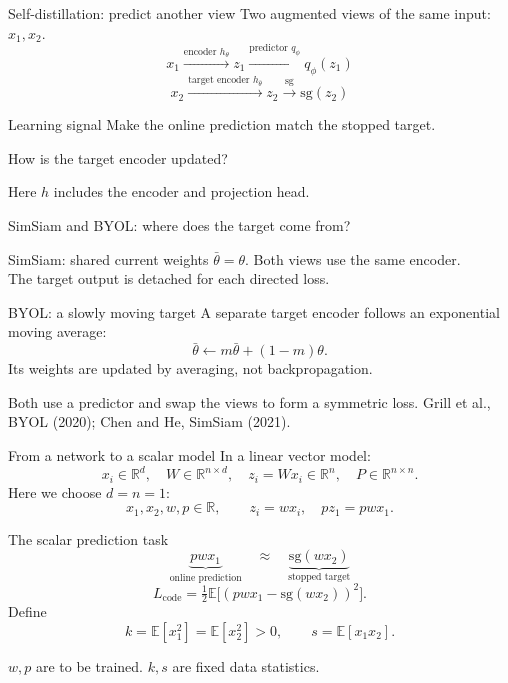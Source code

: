 \documentclass[aspectratio=169]{beamer}
\begin{document}
\begin{frame}{Self-distillation: predict another view}
  Two augmented views of the same input: $x_1,x_2$.
  \[
    x_1\xrightarrow{\text{encoder }h_\theta}z_1
       \xrightarrow{\text{predictor }q_\phi}q_\phi(z_1)
  \]
  \[
    x_2\xrightarrow{\text{target encoder }h_{\bar\theta}}z_2
       \xrightarrow{\mathrm{sg}}\mathrm{sg}(z_2)
  \]
  \begin{block}{Learning signal}
    Make the online prediction match the stopped target.
  \end{block}
  \begin{center}
    \alert{How is the target encoder updated?}
  \end{center}
  {\small Here $h$ includes the encoder and projection head.}
\end{frame}

\begin{frame}{SimSiam and BYOL: where does the target come from?}
  \begin{block}{SimSiam: shared current weights}
    $\bar\theta=\theta$. Both views use the same encoder.\\
    The target output is detached for each directed loss.
  \end{block}
  \begin{block}{BYOL: a slowly moving target}
    A separate target encoder follows an exponential moving average:
    \[
      \bar\theta\leftarrow m\bar\theta+(1-m)\theta.
    \]
    Its weights are updated by averaging, not backpropagation.
  \end{block}
  Both use a predictor and swap the views to form a symmetric loss.
  \vfill
  {\scriptsize Grill et al., BYOL (2020); Chen and He, SimSiam (2021).}
\end{frame}

\begin{frame}{From a network to a scalar model}
  In a linear vector model:
  \[
    x_i\in\mathbb R^d,\quad W\in\mathbb R^{n\times d},
    \quad z_i=Wx_i\in\mathbb R^n,\quad P\in\mathbb R^{n\times n}.
  \]
  Here we choose $d=n=1$:
  \[
    x_1,x_2,w,p\in\mathbb R,\qquad
    z_i=wx_i,\quad pz_1=pwx_1.
  \]

\end{frame}

\begin{frame}{The scalar prediction task}
  \[
    \underbrace{pwx_1}_{\text{online prediction}}
    \quad\approx\quad
    \underbrace{\mathrm{sg}(wx_2)}_{\text{stopped target}}
  \]
  \[
    L_{\mathrm{code}}=\tfrac12\mathbb E
    \big[(pwx_1-\mathrm{sg}(wx_2))^2\big].
  \]
  Define
  \[
    k=\mathbb E[x_1^2]=\mathbb E[x_2^2]>0,
    \qquad s=\mathbb E[x_1x_2].
  \]
  \begin{center}
    $w,p$ are to be trained. \alert{$k,s$ are fixed data statistics.}
  \end{center}
\end{frame}
\end{document}
